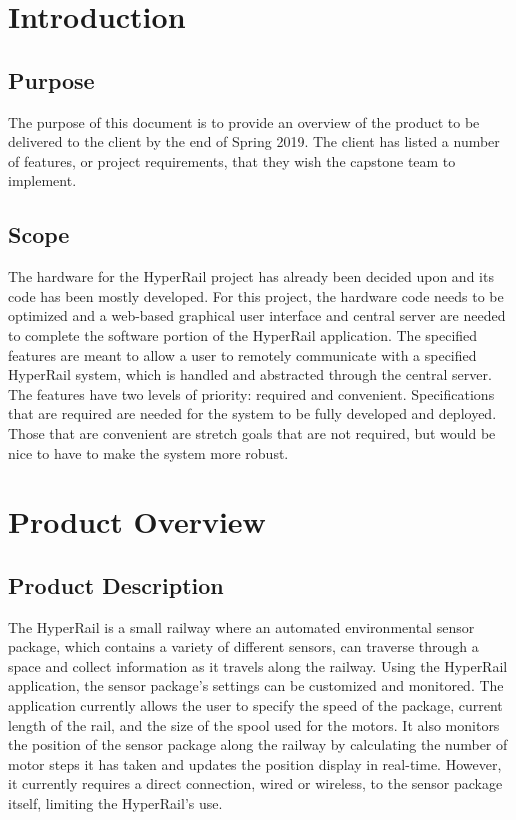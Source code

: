 \documentclass[onecolumn, draftclsnofoot,10pt, compsoc]{IEEEtran}
\begin{document}
\pagebreak


\section{Introduction}

\subsection{Purpose}
The purpose of this document is to provide an overview of the product to be delivered to the client by the end of Spring 2019. The client has listed a number of features, or project requirements, that they wish the capstone team to implement.


\subsection{Scope}
The hardware for the HyperRail project has already been decided upon and its code has been mostly developed. For this project, the hardware code needs to be optimized and a web-based graphical user interface and central server are needed to complete the software portion of the HyperRail application. The specified features are meant to allow a user to remotely communicate with a specified HyperRail system, which is handled and abstracted through the central server. The features have two levels of priority: required and convenient. Specifications that are required are needed for the system to be fully developed and deployed. Those that are convenient are stretch goals that are not required, but would be nice to have to make the system more robust.



\section{Product Overview}

\subsection{Product Description}
The HyperRail is a small railway where an automated environmental sensor package, which contains a variety of different sensors, can traverse through a space and collect information as it travels along the railway. Using the HyperRail application, the sensor package's settings can be customized and monitored. The application currently allows the user to specify the speed of the package, current length of the rail, and the size of the spool used for the motors. It also monitors the position of the sensor package along the railway by calculating the number of motor steps it has taken and updates the position display in real-time. However, it currently requires a direct connection, wired or wireless, to the sensor package itself, limiting the HyperRail's use.
\end{document}

